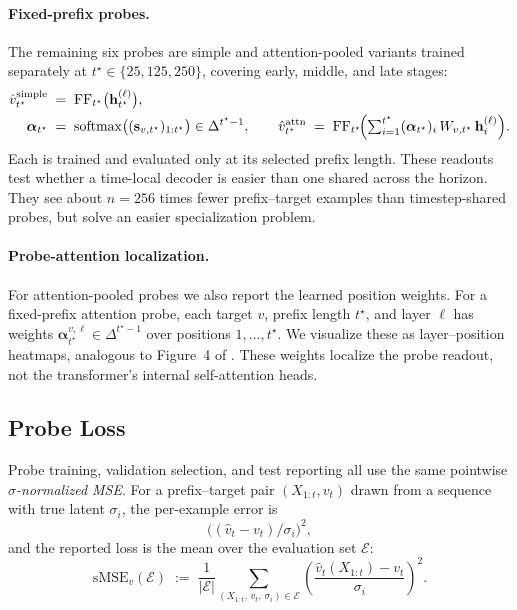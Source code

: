 \documentclass[11pt]{article}
\begin{document}
\paragraph{Fixed-prefix probes.} The remaining six probes are simple and attention-pooled variants trained separately at $t^\star \in \{25,125,250\}$, covering early, middle, and late stages:
\begin{align*}
\hat v_{t^\star}^{\mathrm{simple}}
&\;=\; \mathrm{FF}_{t^\star}\bigl(\mathbf{h}_{t^\star}^{(\ell)}\bigr), \\
\boldsymbol\alpha_{t^\star}
&\;=\; \mathrm{softmax}\bigl((\mathbf{s}_{v,t^\star})_{1:t^\star}\bigr) \in \Delta^{t^\star-1}, \qquad
\hat v_{t^\star}^{\mathrm{attn}}
\;=\; \mathrm{FF}_{t^\star}\!\Bigl(\textstyle\sum_{i=1}^{t^\star}(\boldsymbol\alpha_{t^\star})_i\,W_{v,t^\star}\,\mathbf{h}_i^{(\ell)}\Bigr).
\end{align*}
Each is trained and evaluated only at its selected prefix length. These readouts test whether a time-local decoder is easier than one shared across the horizon. They see about $n=256$ times fewer prefix--target examples than timestep-shared probes, but solve an easier specialization problem. 

\paragraph{Probe-attention localization.} For attention-pooled probes we also report the learned position weights. For a fixed-prefix attention probe, each target $v$, prefix length $t^\star$, and layer $\ell$ has weights $\boldsymbol\alpha_{t^\star}^{v,\ell} \in \Delta^{t^\star-1}$ over positions $1,\ldots,t^\star$. We visualize these as layer--position heatmaps, analogous to Figure~4 of \citet{akyurekWhatLearningAlgorithm2023}. These weights localize the probe readout, not the transformer's internal self-attention heads.

\subsection{Probe Loss}
\label{sec:probe-loss}

Probe training, validation selection, and test reporting all use the same pointwise \emph{$\sigma$-normalized MSE}. For a prefix--target pair $(X_{1:t}, v_t)$ drawn from a sequence with true latent $\sigma_i$, the per-example error is
\[
\bigl( (\hat v_t - v_t)/\sigma_i \bigr)^2,
\]
and the reported loss is the mean over the evaluation set $\mathcal{E}$:
\[
\mathrm{sMSE}_v(\mathcal{E})
\;:=\;
\frac{1}{|\mathcal{E}|}
\sum_{(X_{1:t},\,v_t,\,\sigma_i)\in\mathcal{E}}
\left( \frac{\hat v_t(X_{1:t}) - v_t}{\sigma_i} \right)^2 .
\]
\end{document}
